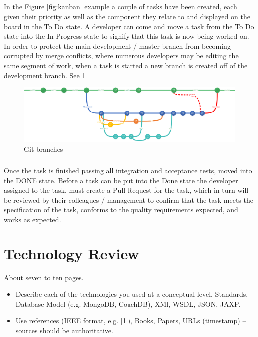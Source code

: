 \paragraph{}In the Figure \ref{fig:kanban} example a couple of tasks have been created, each given their priority as well as the component they relate to and displayed on the board in the To Do state. A developer can come and move a task from the To Do state into the In Progress state to signify that this task is now being worked on. In order to protect the main development / master branch from becoming corrupted by merge conflicts, where numerous developers may be editing the same segment of work, when a task is started a new branch is created off of the development branch\cite{driessen}. See \ref{fig:branches}

\begin{figure}
\includegraphics[width=\textwidth]{img/branch.png}
\caption{Git branches}
\label{fig:branches}
\end{figure}


\paragraph{}
Once the task is finished passing all integration and acceptance tests, moved into the DONE state. Before a task can be put into the Done state the developer assigned to the task, must create a Pull Request for the task, which in turn will be reviewed by their colleagues / management to confirm that the task meets the specification of the task, conforms to the quality requirements expected, and works as expected\cite{driessen}.

\chapter{Technology Review}
About seven to ten pages.
\begin{itemize}
\item Describe each of the technologies you used at a conceptual level. Standards, Database Model (e.g. MongoDB, CouchDB), XMl, WSDL, JSON, JAXP.
\item Use references (IEEE format, e.g. [1]), Books, Papers, URLs (timestamp) – sources should be authoritative. 
\end{itemize}

